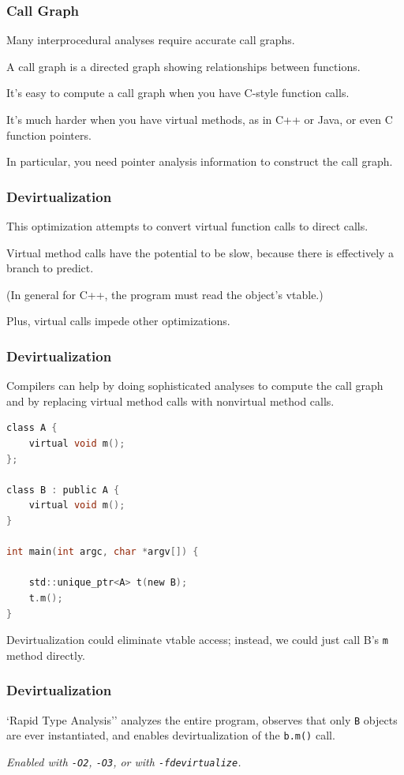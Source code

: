 \begin{frame}
\frametitle{Call Graph}
Many interprocedural analyses require accurate call graphs. 

A \alert{call graph} is a directed graph showing relationships between
functions. 

It's easy to compute a call graph when you have C-style
function calls. 

It's much harder when you have virtual methods, as in
C++ or Java, or even C function pointers. 

In particular, you need pointer
analysis information to construct the call graph.


\end{frame}


\begin{frame}
\frametitle{Devirtualization}

This optimization attempts to convert virtual function calls to direct calls.  

Virtual method calls have the potential to be slow, because there is effectively a branch to predict. 

(In general for C++, the program must read the object's vtable.) 

Plus, virtual calls impede other optimizations.

\end{frame}

\begin{frame}[fragile]
\frametitle{Devirtualization}

Compilers can help by doing sophisticated analyses to compute the call graph and by replacing virtual method calls with nonvirtual method calls.  


  \begin{lstlisting}[language=C]
class A {
    virtual void m();
};

class B : public A {
    virtual void m();
}

int main(int argc, char *argv[]) {

    std::unique_ptr<A> t(new B);
    t.m();
}
  \end{lstlisting}

Devirtualization could eliminate vtable access; instead, we could just call B's {\tt m} method
directly.

\end{frame}

\begin{frame}
\frametitle{Devirtualization}

`Rapid Type Analysis'' analyzes the entire program, observes that
only {\tt B} objects are ever instantiated, and enables devirtualization
of the {\tt b.m()} call.

\emph{Enabled with {\tt -O2}, {\tt -O3}, or with {\tt -fdevirtualize}.}

\end{frame}

